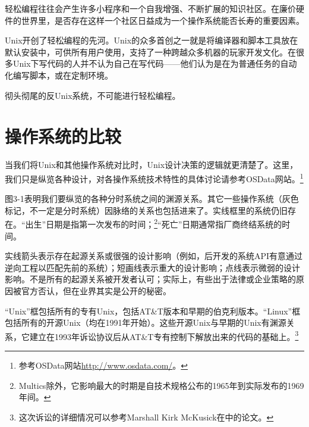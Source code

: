 \documentclass[12pt,oneside]{book}
\begin{document}
轻松编程往往会产生许多小程序和一个自我增强、不断扩展的知识社区。在廉价硬件的世界里，是否存在这样一个社区日益成为一个操作系统能否长寿的重要因素。

Unix开创了轻松编程的先河。Unix的众多首创之一就是将编译器和脚本工具放在默认安装中，可供所有用户使用，支持了一种跨越众多机器的玩家开发文化。在很多Unix下写代码的人并不认为自己在写代码——他们认为是在为普通任务的自动化编写脚本，或在定制环境。

彻头彻尾的反Unix系统，不可能进行轻松编程。

\section{操作系统的比较}
当我们将Unix和其他操作系统对比时，Unix设计决策的逻辑就更清楚了。这里，我们只是纵览各种设计，对各操作系统技术特性的具体讨论请参考OSData网站。\footnote{参考OSData网站\href{http://www.osdata.com/}{http://www.osdata.com/}。}

图3-1表明我们要纵览的各种分时系统之间的渊源关系。其它一些操作系统（灰色标记，不一定是分时系统）因脉络的关系也包括进来了。实线框里的系统仍旧存在。“出生”日期是指第一次发布的时间；\footnote{Multics除外，它影响最大的时期是自技术规格公布的1965年到实际发布的1969年间。}“死亡”日期通常指厂商终结系统的时间。

实线箭头表示存在起源关系或很强的设计影响（例如，后开发的系统API有意通过逆向工程以匹配先前的系统）；短画线表示重大的设计影响；点线表示微弱的设计影响。不是所有的起源关系被开发者认可；实际上，有些出于法律或企业策略的原因被官方否认，但在业界其实是公开的秘密。

“Unix”框包括所有的专有Unix，包括AT\&{}T版本和早期的伯克利版本。“Linux”框包括所有的开源Unix（均在1991年开始）。这些开源Unix与早期的Unix有渊源关系，它建立在1993年诉讼协议后从AT\&{}T专有控制下解放出来的代码的基础上。\footnote{这次诉讼的详细情况可以参考Marshall Kirk McKusick在\cite{OpenSources}中的论文。}
\end{document}
